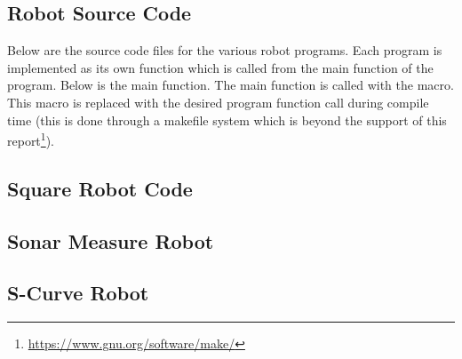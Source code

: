 \documentclass[main.tex]{subfiles}
\begin{document}
\begin{appendices}

\section{Robot Source Code}
\label{ap:appendA}
Below are the source code files for the various robot programs. Each program is
implemented as its own function which is called from the main function of the
program. Below is the main function. The main function is called with the
 macro. This macro is replaced with the desired program function
call during compile time (this is done through a makefile system which is beyond
the support of this report\footnote{\url{https://www.gnu.org/software/make/}}). 



\subsection*{Square Robot Code}

	
\subsection*{Sonar Measure Robot}


\subsection*{S-Curve Robot}


\end{appendices}
\end{document}
